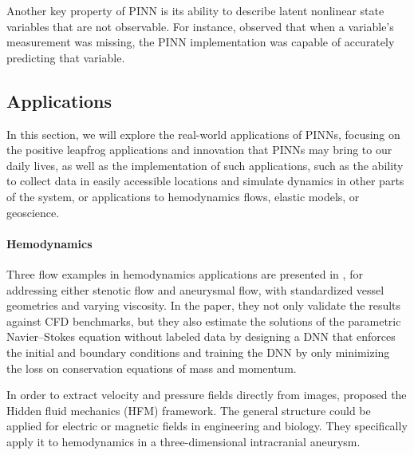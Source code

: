 \documentclass[pdflatex,sn-basic]{sn-jnl}%
\theoremstyle{thmstyleone}%
\theoremstyle{thmstyletwo}%
\theoremstyle{thmstylethree}%
\begin{document}
Another key property of PINN is its ability to describe latent nonlinear state variables that are not observable.
For instance, \cite{Zha2020_PhysicsInformedMulti_LiuZLS} 
observed that when a variable's measurement was missing, the PINN implementation was capable of accurately predicting that variable. 







\subsection{Applications}

In this section, we will explore the real-world applications of PINNs, focusing on the positive leapfrog applications and innovation that PINNs may bring to our daily lives, as well as the implementation of such applications,
such as the ability to collect data in easily accessible locations and simulate dynamics in other parts of the system, or applications to hemodynamics flows, elastic models, or  geoscience.


\paragraph{Hemodynamics}
Three flow examples in hemodynamics applications are presented in
\cite{Sun2020_SurrogateModelingFluid_GaoSGPW}, for addressing either stenotic flow and aneurysmal flow, with standardized vessel geometries and varying viscosity.
In the paper, they not only validate the results against CFD benchmarks, but they also estimate the solutions of the parametric Navier–Stokes equation without labeled data by designing a DNN that enforces the initial and boundary conditions and training the DNN by only minimizing the loss on conservation equations of mass and momentum. 

In order to extract  velocity and pressure fields directly from images, 
\cite{Rai2020_HiddenFluidMechanics_YazRYK}
proposed the  Hidden fluid mechanics (HFM) framework.
The general structure could be applied for electric or magnetic fields in engineering and biology.
They specifically apply it to hemodynamics in a three-dimensional intracranial aneurysm. 
\end{document}

